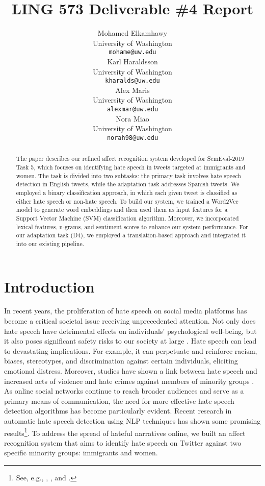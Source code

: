 \documentclass[11pt,a4paper]{article}
\title{LING 573 Deliverable \#4 Report}
\author{Mohamed Elkamhawy \\
  \small University of Washington \\
  \texttt{mohame@uw.edu} \\\And
  Karl Haraldsson \\
  \small University of Washington \\
  \texttt{kharalds@uw.edu} \\\And
  Alex Maris \\
  \small University of Washington \\
  \texttt{alexmar@uw.edu} \\\And
  Nora Miao \\
  \small University of Washington \\
  \texttt{norah98@uw.edu} \\
  }
\date{}
\begin{document}
\maketitle
\begin{abstract}
The paper describes our refined affect recognition system developed for SemEval-2019 Task 5, which focuses on identifying hate speech in tweets targeted at immigrants and women. The task is divided into two subtasks: the primary task involves hate speech detection in English tweets, while the adaptation task addresses Spanish tweets. We employed a binary classification approach, in which each given tweet is classified as either hate speech or non-hate speech. To build our system, we trained a Word2Vec model to generate word embeddings and then used them as input features for a Support Vector Machine (SVM) classification algorithm. Moreover, we incorporated  lexical features, n-grams, and sentiment scores to enhance our system performance. For our adaptation task (D4), we employed a translation-based approach and integrated it into our existing pipeline. 


\end{abstract}

\section{Introduction}
In recent years, the proliferation of hate speech on social media platforms has become a critical societal issue receiving unprecedented attention. Not only does hate speech have detrimental effects on individuals’ psychological well-being, but it also poses significant safety risks to our society at large \citep{saha2019prevalence}. Hate speech can lead to devastating implications. For example, it can perpetuate and reinforce racism, biases, stereotypes, and discrimination against certain individuals, eliciting emotional distress. Moreover, studies have shown a link between hate speech and increased acts of violence and hate crimes against members of minority groups \citep{relia2019race}. As online social networks continue to reach broader audiences and serve as a primary means of communication, the need for more effective hate speech detection algorithms has become particularly evident. Recent research in automatic hate speech detection using NLP techniques has shown some promising results\footnote{See, e.g., \citet{asogwa2022hate},  \citet{kotarcic2023humanintheloop}, and \citet{schmidt-wiegand-2017-survey}.}. To address the spread of hateful narratives online, we built an affect recognition system that aims to identify hate speech on Twitter against two specific minority groups: immigrants and women.
\end{document}
